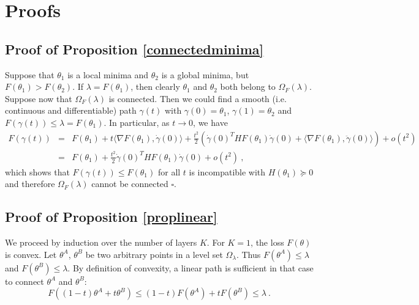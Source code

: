 \section{Proofs}

\subsection{Proof of Proposition \ref{connectedminima}}

Suppose that $\theta_1$ is a local minima and $\theta_2$ is a global minima, 
but $F(\theta_1) > F(\theta_2)$. If $\lambda = F(\theta_1)$, then clearly 
$\theta_1$ and $\theta_2$ both belong to $\Omega_F(\lambda)$. Suppose 
now that $\Omega_F(\lambda)$ 
is connected. Then we could find a smooth (i.e. continuous and differentiable) path $\gamma(t)$ 
with $\gamma(0) = \theta_1$, $\gamma(1)= \theta_2$ and $F(\gamma(t)) \leq \lambda = F(\theta_1)$.
In particular, as $t \to 0$, we have
\begin{eqnarray*}
F(\gamma(t)) &=& F(\theta_1) + t \langle \nabla F(\theta_1) , \dot{\gamma}(0) \rangle + \frac{t^2}{2} \left(\dot{\gamma}(0)^T H F(\theta_1) \dot{\gamma}(0) + \langle \nabla F(\theta_1), \ddot{\gamma}(0) \rangle \right) + o(t^2) \\
&=& F(\theta_1) +   \frac{t^2}{2}  \dot{\gamma}(0)^T H F(\theta_1) \dot{\gamma}(0)  + o(t^2) ~,
\end{eqnarray*}
which shows that $F(\gamma(t)) \leq F(\theta_1)$ for all $t$ is incompatible with $H(\theta_1) \succeq 0$ and therefore $\Omega_F(\lambda)$ cannot be connected $\square$.


\subsection{Proof of Proposition \ref{proplinear}}

We proceed by induction over the number of layers $K$. 
For $K=1$, the loss $F(\theta)$ is convex. Let  $\theta^A$, $\theta^B$ be two arbitrary points 
in a level set $\Omega_\lambda$. Thus $F(\theta^A) \leq \lambda$ and $F(\theta^B) \leq \lambda$. By definition
of convexity, a linear path is sufficient in that case to connect $\theta^A$ and $\theta^B$:
$$F( (1-t) \theta^A + t \theta^B) \leq (1-t) F(\theta^A) + t F(\theta^B) \leq \lambda~.$$

